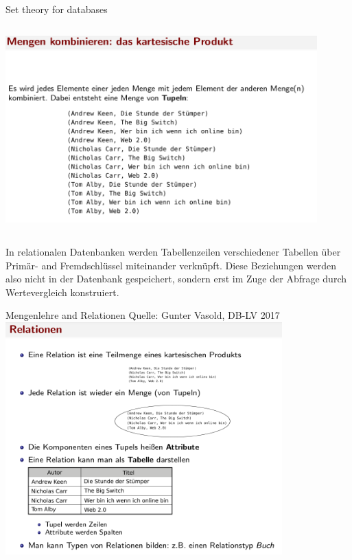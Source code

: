 \begin{frame}{Set theory for databases}
\begin{columns}[T,onlytextwidth]
      \begin{block}{}
      \centering \includegraphics[width=0.9\textwidth]{img/mengen-vasold2.png}
      \end{block}
  \end{columns}
  \footnotesize
In relationalen Datenbanken werden Tabellenzeilen verschiedener Tabellen über
Primär- and Fremdschlüssel miteinander verknüpft.
Diese Beziehungen werden also nicht in der Datenbank gespeichert, sondern erst
im Zuge der Abfrage durch Wertevergleich konstruiert.
\end{frame}


\begin{frame}{Mengenlehre and Relationen}
\small 
Quelle: Gunter Vasold, DB-LV 2017 
  \includegraphics[width=0.8\textwidth]{img/menge-vasold3.png}
\end{frame}


